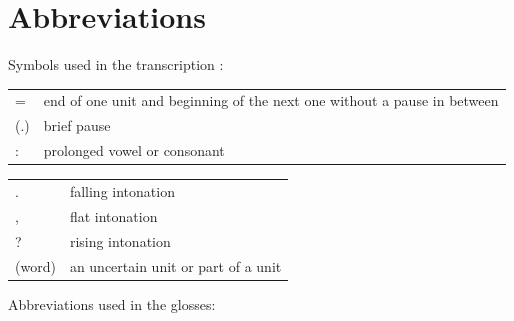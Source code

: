 \documentclass[output=paper,colorlinks,citecolor=brown]{langscibook}
\begin{document}
\section*{Abbreviations}

Symbols used in the transcription \citep{Jefferson2004}:

\begin{tabularx}{.45\textwidth}{lQ}
= & end of one unit and beginning of the next one without a pause in between\\
(.) & brief pause\\
: & prolonged vowel or consonant\\
\end{tabularx}
\begin{tabularx}{.45\textwidth}{lQ}
. & falling intonation\\
, & flat intonation\\
? & rising intonation\\
(word) &  an uncertain unit or part of a unit
\end{tabularx}

Abbreviations used in the glosses:
\end{document}
